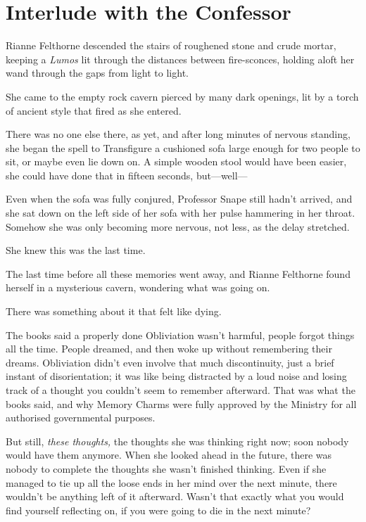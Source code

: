 \chapter{Interlude with the
Confessor}\label{interlude-with-the-confessor}

Rianne Felthorne descended the stairs of roughened stone and crude
mortar, keeping a \emph{Lumos} lit through the distances between
fire-sconces, holding aloft her wand through the gaps from light to
light.

She came to the empty rock cavern pierced by many dark openings, lit by
a torch of ancient style that fired as she entered.

There was no one else there, as yet, and after long minutes of nervous
standing, she began the spell to Transfigure a cushioned sofa large
enough for two people to sit, or maybe even lie down on. A simple wooden
stool would have been easier, she could have done that in fifteen
seconds, but---well---

Even when the sofa was fully conjured, Professor Snape still hadn't
arrived, and she sat down on the left side of her sofa with her pulse
hammering in her throat. Somehow she was only becoming more nervous, not
less, as the delay stretched.

She knew this was the last time.

The last time before all these memories went away, and Rianne Felthorne
found herself in a mysterious cavern, wondering what was going on.

There was something about it that felt like dying.

The books said a properly done Obliviation wasn't harmful, people forgot
things all the time. People dreamed, and then woke up without
remembering their dreams. Obliviation didn't even involve that much
discontinuity, just a brief instant of disorientation; it was like being
distracted by a loud noise and losing track of a thought you couldn't
seem to remember afterward. That was what the books said, and why Memory
Charms were fully approved by the Ministry for all authorised
governmental purposes.

But still, \emph{these thoughts,} the thoughts she was thinking right
now; soon nobody would have them anymore. When she looked ahead in the
future, there was nobody to complete the thoughts she wasn't finished
thinking. Even if she managed to tie up all the loose ends in her mind
over the next minute, there wouldn't be anything left of it afterward.
Wasn't that exactly what you would find yourself reflecting on, if you
were going to die in the next minute?


